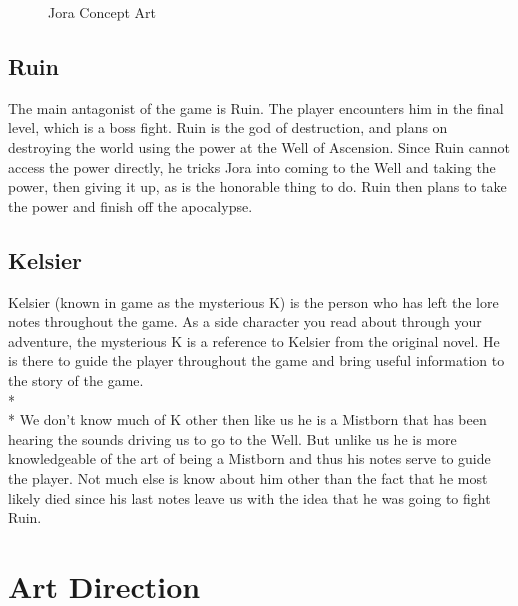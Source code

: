 \documentclass{article}
\begin{document}
\begin{figure}[!htb]
  \caption {Jora Concept Art}
  \end{figure}


\subsection{Ruin}
The main antagonist of the game is Ruin. The player encounters him in the final level, which is a boss fight. Ruin is the god of destruction, and plans on destroying the world using the power at the Well of Ascension. Since Ruin cannot access the power directly, he tricks Jora into coming to the Well and taking the power, then giving it up, as is the honorable thing to do. Ruin then plans to take the power and finish off the apocalypse.

\subsection{Kelsier}
Kelsier (known in game as the mysterious K) is the person who has left the lore notes throughout the game.
As a side character you read about through your adventure, the mysterious K is a reference to Kelsier from the original novel. He is there to guide the player throughout the game and bring useful information to the story of the game.
\\*\\*
We don’t know much of K other then like us he is a Mistborn that has been hearing the sounds driving us to go to the Well. But unlike us he is more knowledgeable of the art of being a Mistborn and thus his notes serve to guide the player. Not much else is know about him other than the fact that he most likely died since his last notes leave us with the idea that he was going to fight Ruin.

\section{Art Direction}
\end{document}
